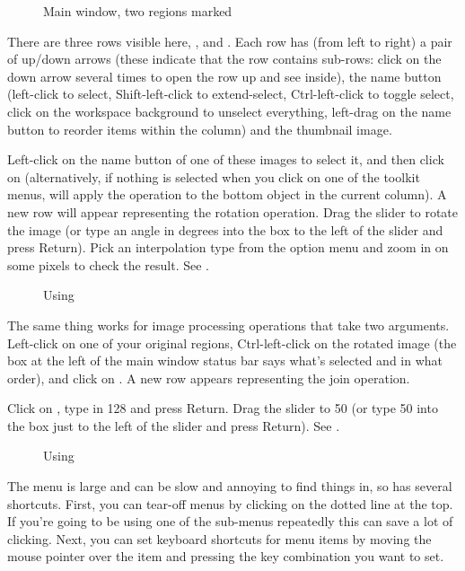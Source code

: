 \begin{figure}
\caption{Main window, two regions marked}
\end{figure}

There are three rows visible here, ,  and . Each row
has (from left to right) a pair of up/down arrows (these indicate that
the row contains sub-rows: click on the down arrow several times to
open the row up and see inside), the name button (left-click to select,
Shift-left-click to extend-select, Ctrl-left-click to toggle select, click
on the workspace background to unselect everything, left-drag on the name
button to reorder items within the column) and the thumbnail image.

Left-click on the name button of one of these images to select it, and
then click on 
(alternatively, if nothing is selected when you click on one of the toolkit
menus, \nip{} will apply the operation to the bottom object in the current
column). A new row will appear representing the rotation operation. Drag
the slider to rotate the image (or type an angle in degrees into the box
to the left of the slider and press Return). Pick an interpolation type from
the option menu and zoom in on some pixels to check the result. 
See .

\begin{figure}
\caption{Using }
\end{figure}

The same thing works for image processing operations that take two arguments.
Left-click on one of your original regions, Ctrl-left-click on the rotated
image (the box at the left of the main window status bar says what's selected
and in what order), and click on . A new row appears representing the join operation.

Click on , type in 128 and press Return. Drag the
 slider to 50 (or type 50 into the box just to the left of the
slider and press Return). See .

\begin{figure}
\caption{Using }
\end{figure}

The  menu is large and can be slow and annoying to find
things in, so \nip{} has several shortcuts. First, you can tear-off menus
by clicking on the dotted line at the top. If you're going to be using
one of the sub-menus repeatedly this can save a lot of clicking. Next,
you can set keyboard shortcuts for menu items by moving the mouse pointer
over the item and pressing the key combination you want to set. 


